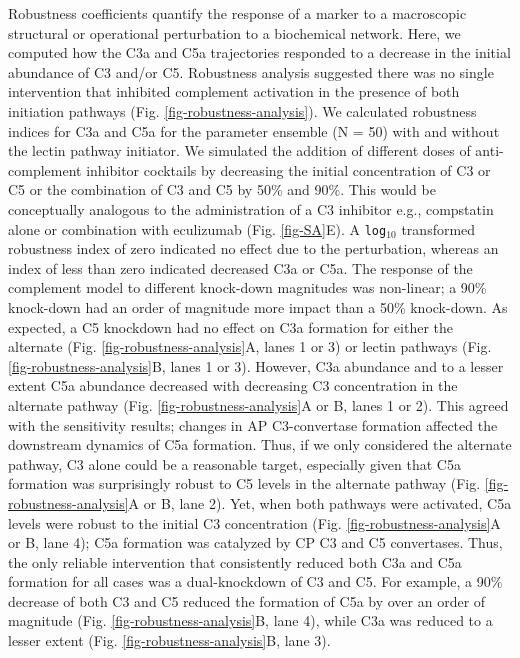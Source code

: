 \documentclass[12pt]{article}
\begin{document}
Robustness coefficients quantify the response of a marker to a macroscopic structural or operational perturbation to a biochemical network.
Here, we computed how the C3a and C5a trajectories responded to a decrease in the initial abundance of C3 and/or C5.
Robustness analysis suggested there was no single intervention that inhibited complement activation in the presence of both initiation pathways (Fig. \ref{fig-robustness-analysis}).
We calculated robustness indices for C3a and C5a for the parameter ensemble (N = 50) with and without the lectin pathway initiator.
We simulated the addition of different doses of anti-complement inhibitor cocktails by decreasing the initial concentration of C3 or C5 or the combination of C3 and C5 by 50\% and 90\%.
This would be conceptually analogous to the administration of a C3 inhibitor e.g., compstatin alone or combination with eculizumab (Fig. \ref{fig-SA}E).
A \texttt{log$_{10}$} transformed robustness index of zero indicated no effect due to the perturbation, whereas an index of less than zero indicated decreased C3a or C5a.
The response of the complement model to different knock-down magnitudes was non-linear; a 90\% knock-down had an order of magnitude more impact than a 50\% knock-down.
As expected, a C5 knockdown had no effect on C3a formation for either the alternate (Fig. \ref{fig-robustness-analysis}A, lanes 1 or 3) or lectin pathways
(Fig. \ref{fig-robustness-analysis}B, lanes 1 or 3).
However, C3a abundance and to a lesser extent C5a abundance decreased with decreasing C3 concentration in the alternate pathway (Fig. \ref{fig-robustness-analysis}A or B, lanes 1 or 2).
This agreed with the sensitivity results; changes in AP C3-convertase formation affected the downstream dynamics of C5a formation.
Thus, if we only considered the alternate pathway, C3 alone could be a reasonable target, especially given that C5a formation was surprisingly robust to C5 levels in the alternate pathway (Fig. \ref{fig-robustness-analysis}A or B, lane 2).
Yet, when both pathways were activated, C5a levels were robust to the initial C3 concentration (Fig. \ref{fig-robustness-analysis}A or B, lane 4);
C5a formation was catalyzed by CP C3 and C5 convertases.
Thus, the only reliable intervention that consistently reduced both C3a and C5a formation for all cases was a dual-knockdown of C3 and C5.
For example, a 90\% decrease of both C3 and C5 reduced the formation of C5a by over an order of magnitude (Fig. \ref{fig-robustness-analysis}B, lane 4),
while C3a was reduced to a lesser extent (Fig. \ref{fig-robustness-analysis}B, lane 3).
\end{document}
